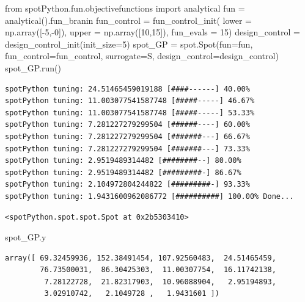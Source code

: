 \documentclass[
  letterpaper,
  DIV=11,
  numbers=noendperiod]{scrreprt}
\newenvironment{Shaded}{\begin{snugshade}}{\end{snugshade}}
\newcommand{\DecValTok}[1]{\textcolor[rgb]{0.68,0.00,0.00}{#1}}
\newcommand{\ImportTok}[1]{\textcolor[rgb]{0.00,0.46,0.62}{#1}}
\newcommand{\NormalTok}[1]{\textcolor[rgb]{0.00,0.23,0.31}{#1}}
\newcommand{\OperatorTok}[1]{\textcolor[rgb]{0.37,0.37,0.37}{#1}}
\begin{document}
\begin{Shaded}
\begin{Highlighting}[]
\ImportTok{from}\NormalTok{ spotPython.fun.objectivefunctions }\ImportTok{import}\NormalTok{ analytical}
\NormalTok{fun }\OperatorTok{=}\NormalTok{ analytical().fun\_branin}
\NormalTok{fun\_control }\OperatorTok{=}\NormalTok{ fun\_control\_init(}
\NormalTok{    lower }\OperatorTok{=}\NormalTok{ np.array([}\OperatorTok{{-}}\DecValTok{5}\NormalTok{,}\OperatorTok{{-}}\DecValTok{0}\NormalTok{]),}
\NormalTok{    upper }\OperatorTok{=}\NormalTok{ np.array([}\DecValTok{10}\NormalTok{,}\DecValTok{15}\NormalTok{]),}
\NormalTok{    fun\_evals }\OperatorTok{=} \DecValTok{15}\NormalTok{)    }
\NormalTok{design\_control }\OperatorTok{=}\NormalTok{ design\_control\_init(init\_size}\OperatorTok{=}\DecValTok{5}\NormalTok{)}
\NormalTok{spot\_GP }\OperatorTok{=}\NormalTok{ spot.Spot(fun}\OperatorTok{=}\NormalTok{fun, }
\NormalTok{                    fun\_control}\OperatorTok{=}\NormalTok{fun\_control,}
\NormalTok{                    surrogate}\OperatorTok{=}\NormalTok{S, }
\NormalTok{                    design\_control}\OperatorTok{=}\NormalTok{design\_control)}
\NormalTok{spot\_GP.run()}
\end{Highlighting}
\end{Shaded}

\begin{verbatim}
spotPython tuning: 24.51465459019188 [####------] 40.00% 
spotPython tuning: 11.003077541587748 [#####-----] 46.67% 
spotPython tuning: 11.003077541587748 [#####-----] 53.33% 
spotPython tuning: 7.281227279299504 [######----] 60.00% 
spotPython tuning: 7.281227279299504 [#######---] 66.67% 
spotPython tuning: 7.281227279299504 [#######---] 73.33% 
spotPython tuning: 2.9519489314482 [########--] 80.00% 
spotPython tuning: 2.9519489314482 [#########-] 86.67% 
spotPython tuning: 2.104972804244822 [#########-] 93.33% 
spotPython tuning: 1.9431600962086772 [##########] 100.00% Done...
\end{verbatim}

\begin{verbatim}
<spotPython.spot.spot.Spot at 0x2b5303410>
\end{verbatim}

\begin{Shaded}
\begin{Highlighting}[]
\NormalTok{spot\_GP.y}
\end{Highlighting}
\end{Shaded}

\begin{verbatim}
array([ 69.32459936, 152.38491454, 107.92560483,  24.51465459,
        76.73500031,  86.30425303,  11.00307754,  16.11742138,
         7.28122728,  21.82317903,  10.96088904,   2.95194893,
         3.02910742,   2.1049728 ,   1.9431601 ])
\end{verbatim}
\end{document}
